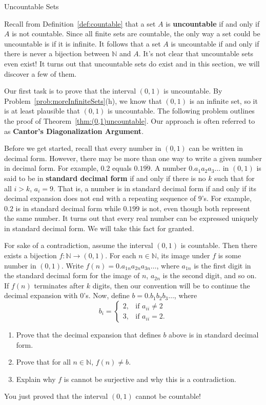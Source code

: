 \begin{section}{Uncountable Sets}

Recall from Definition~\ref{def:countable} that a set $A$ is \textbf{uncountable} if and only if $A$ is not countable.  Since all finite sets are countable, the only way a set could be uncountable is if it is infinite.  It follows that a set $A$ is uncountable if and only if there is never a bijection between $\mathbb{N}$ and $A$.  It's not clear that uncountable sets even exist!  It turns out that uncountable sets do exist and in this section, we will discover a few of them.

Our first task is to prove that the interval $(0,1)$ is uncountable.  By Problem~\ref{prob:moreInfiniteSets}(h), we know that $(0,1)$ is an infinite set, so it is at least plausible that $(0,1)$ is uncountable.  The following problem outlines the proof of Theorem~\ref{thm:(0,1)uncountable}.  Our approach is often referred to as \textbf{Cantor's Diagonalization Argument}.

Before we get started, recall that every number in $(0,1)$ can be written in decimal form. However, there may be more than one way to write a given number in decimal form.  For example, $0.2$ equals $0.1\overline{99}$.  A number $0.a_1a_2a_3\ldots$ in $(0,1)$ is said to be in \textbf{standard decimal form} if and only if there is no $k$ such that for all $i>k$, $a_i=9$. That is, a number is in standard decimal form if and only if its decimal expansion does not end with a repeating sequence of 9's. For example, $0.2$ is in standard decimal form while $0.1\overline{99}$ is not, even though both represent the same number. It turns out that every real number can be expressed uniquely in standard decimal form. We will take this fact for granted.

\begin{problem}
For sake of a contradiction, assume the interval $(0,1)$ is countable.  Then there exists a bijection $f:\mathbb{N}\to (0,1)$. For each $n\in\mathbb{N}$, its image under $f$ is some number in $(0,1)$.  Write $f(n)=0.a_{1n}a_{2n}a_{3n}\ldots$, where $a_{1n}$ is the first digit in the standard decimal form for the image of $n$, $a_{2n}$ is the second digit, and so on. If $f(n)$ terminates after $k$ digits, then our convention will be to continue the decimal expansion with 0's. Now, define $b=0.b_1b_2b_3\ldots$, where
\[
b_i=\begin{cases}
2, & \text{if }a_{ii}\neq 2\\
3, & \text{if }a_{ii}=2.
\end{cases}
\]
\begin{enumerate}[label=\textrm{(\alph*)}]
\item Prove that the decimal expansion that defines $b$ above is in standard decimal form.
\item Prove that for all $n\in\mathbb{N}$, $f(n)\neq b$.
\item Explain why $f$ is cannot be surjective and why this is a contradiction.
\end{enumerate}
You just proved that the interval $(0,1)$ cannot be countable!
\end{problem}


\end{section}
